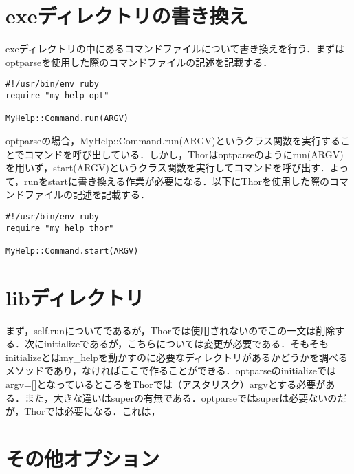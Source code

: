 \section{exeディレクトリの書き換え}\label{exeux30c7ux30a3ux30ecux30afux30c8ux30eaux306eux66f8ux304dux63dbux3048}

exeディレクトリの中にあるコマンドファイルについて書き換えを行う．まずはoptparseを使用した際のコマンドファイルの記述を記載する．

\begin{verbatim}
#!/usr/bin/env ruby                                                                                                               
require "my_help_opt"

MyHelp::Command.run(ARGV)
\end{verbatim}

optparseの場合，MyHelp::Command.run(ARGV)というクラス関数を実行することでコマンドを呼び出している．しかし，Thorはoptparseのようにrun(ARGV)を用いず，start(ARGV)というクラス関数を実行してコマンドを呼び出す．よって，runをstartに書き換える作業が必要になる．以下にThorを使用した際のコマンドファイルの記述を記載する．

\begin{verbatim}
#!/usr/bin/env ruby                                                                                                               
require "my_help_thor"

MyHelp::Command.start(ARGV)
\end{verbatim}

\section{libディレクトリ}\label{libux30c7ux30a3ux30ecux30afux30c8ux30ea}

まず，self.runについてであるが，Thorでは使用されないのでこの一文は削除する．次にinitializeであるが，こちらについては変更が必要である．そもそもinitializeとはmy\_helpを動かすのに必要なディレクトリがあるかどうかを調べるメソッドであり，なければここで作ることができる．optparseのinitializeではargv={[}{]}となっているところをThorでは（アスタリスク）argvとする必要がある．また，大きな違いはsuperの有無である．optparseではsuperは必要ないのだが，Thorでは必要になる．これは，

\section{その他オプション}\label{ux305dux306eux4ed6ux30aaux30d7ux30b7ux30e7ux30f3}

